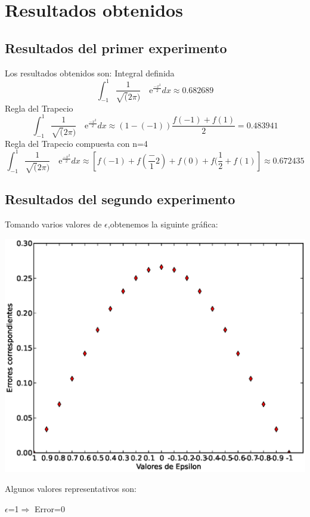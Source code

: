 \section{Resultados obtenidos}
\label{3:sec:3}
\parindent=0.2cm
\raggedright
\subsection{Resultados del primer experimento}
Los resultados obtenidos son:
Integral definida 
\[
\int_{-1}^{1} \frac{1}{\sqrt(2\pi)} \quad\text{e}^{\frac{-x^2}{2}}dx\approx0.682689 
\]
Regla del Trapecio
\[
\int_{-1}^{1} \frac{1}{\sqrt(2\pi)} \quad\text{e}^{\frac{-x^2}{2}}dx\approx\left(1-(-1)\right)\frac{f(-1)+f(1)}{2}=0.483941
\]
Regla del Trapecio compuesta con n=4
\[
\int_{-1}^{1} \frac{1}{\sqrt(2\pi)} \quad\text{e}^{\frac{-x^2}{2}}dx\approx\left[f(-1) + f(\frac-{1}{2}) + f(0) + f(\frac{1}{2} + f(1)\right]\approx0.672435
\]
\subsection{Resultados del segundo experimento}
Tomando varios valores de $\epsilon$,obtenemos la siguinte gráfica:








\includegraphics[width=1\textwidth]{images/imgraf}

Algunos valores representativos son:

$\epsilon$=1$\Rightarrow$ Error=0

